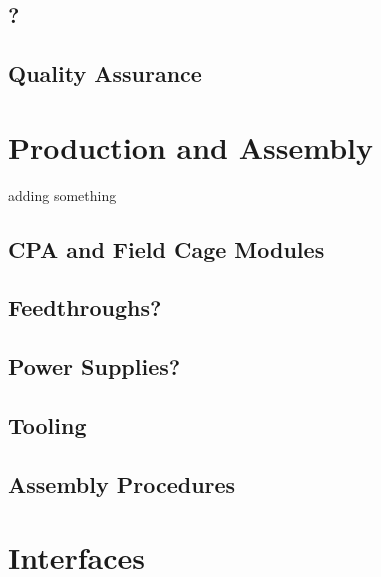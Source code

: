 \subsection{?}
\label{sec:fdsp-hv-?}


\subsection{Quality Assurance}
\label{sec:fdsp-hv-qa}




\section{Production and Assembly}
\label{sec:fdsp-hv-prod-assy}
adding something

\subsection{CPA and Field Cage Modules}
\label{sec:fdsp-hv-supplies}

\subsection{Feedthroughs?}
\label{sec:fdsp-hv-feedthroughs}


\subsection{Power Supplies?}
\label{sec:fdsp-hv-supplies}



\subsection{Tooling}
\label{sec:fdsp-hv-tooling}


\subsection{Assembly Procedures}
\label{sec:fdsp-hv-assy}



\section{Interfaces}
\label{sec:fdsp-hv-intfc}

